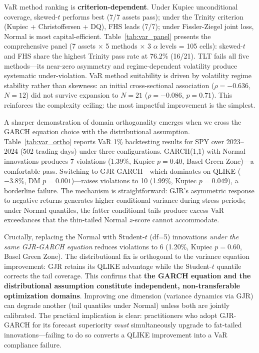 VaR method ranking is \textbf{criterion-dependent}. Under Kupiec unconditional coverage, skewed-$t$ performs best (7/7 assets pass); under the Trinity criterion (Kupiec + Christoffersen + DQ), FHS leads (7/7); under Fissler-Ziegel joint loss, Normal is most capital-efficient. Table~\ref{tab:var_panel} presents the comprehensive panel (7 assets $\times$ 5 methods $\times$ 3 $\alpha$ levels = 105 cells): skewed-$t$ and FHS share the highest Trinity pass rate at 76.2\% (16/21). TLT fails all five methods---its near-zero asymmetry and regime-dependent volatility produce systematic under-violation. VaR method suitability is driven by volatility regime stability rather than skewness: an initial cross-sectional association ($\rho = -0.636$, $N = 12$) did not survive expansion to $N = 21$ ($\rho = -0.086$, $p = 0.71$). This reinforces the complexity ceiling: the most impactful improvement is the simplest.

A sharper demonstration of domain orthogonality emerges when we cross the GARCH equation choice with the distributional assumption. Table~\ref{tab:var_ortho} reports VaR 1\% backtesting results for SPY over 2023--2024 (502 trading days) under three configurations. GARCH(1,1) with Normal innovations produces 7 violations (1.39\%, Kupiec $p = 0.40$, Basel Green Zone)---a comfortable pass. Switching to GJR-GARCH---which dominates on QLIKE ($-3.8\%$, DM $p = 0.001$)---raises violations to 10 (1.99\%, Kupiec $p = 0.049$), a borderline failure. The mechanism is straightforward: GJR's asymmetric response to negative returns generates higher conditional variance during stress periods; under Normal quantiles, the fatter conditional tails produce excess VaR exceedances that the thin-tailed Normal $z$-score cannot accommodate.

Crucially, replacing the Normal with Student-$t$ (df=5) innovations \textit{under the same GJR-GARCH equation} reduces violations to 6 (1.20\%, Kupiec $p = 0.60$, Basel Green Zone). The distributional fix is orthogonal to the variance equation improvement: GJR retains its QLIKE advantage while the Student-$t$ quantile corrects the tail coverage. This confirms that \textbf{the GARCH equation and the distributional assumption constitute independent, non-transferable optimization domains}. Improving one dimension (variance dynamics via GJR) can degrade another (tail quantiles under Normal) unless both are jointly calibrated. The practical implication is clear: practitioners who adopt GJR-GARCH for its forecast superiority \textit{must} simultaneously upgrade to fat-tailed innovations---failing to do so converts a QLIKE improvement into a VaR compliance failure.

